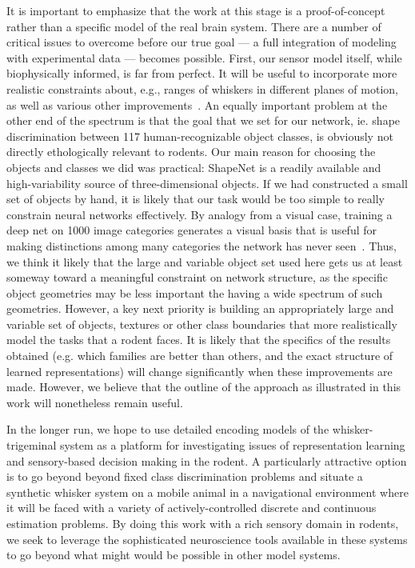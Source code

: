 It is important to emphasize that the work at this stage is a proof-of-concept rather than a specific model of the real brain system.  
There are a number of critical issues to overcome before our true goal --- a full integration of modeling with experimental data --- becomes possible.    
First, our sensor model itself, while biophysically informed, is far from perfect. 
It will be useful to incorporate more realistic constraints about, e.g., ranges of whiskers in different planes of motion, as well as various other improvements~\cite{Quist2014, Huet2016}.
An equally important problem at the other end of the spectrum is that the goal that we set for our network, ie. shape discrimination between 117 human-recognizable object classes, is obviously not directly ethologically relevant to rodents. 
Our main reason for choosing the objects and classes we did was practical: ShapeNet is a readily available and high-variability source of three-dimensional objects. 
If we had constructed a small set of objects by hand, it is likely that our task would be too simple to really constrain neural networks effectively. 
By analogy from a visual case, training a deep net on 1000 image categories generates a visual basis that is useful for making distinctions among many categories the network has never seen~\cite{Yamins2014,cadieu2014deep,razavian2014cnn}.
Thus, we think it likely that the large and variable object set used here gets us at least someway toward a meaningful constraint on network structure, as the specific object geometries may be less important the having a wide spectrum of such geometries. 
However, a key next priority is building an appropriately large and variable set of objects, textures or other class boundaries that more realistically model the tasks that a rodent faces.
It is likely that the specifics of the results obtained (e.g. which families are better than others, and the exact structure of learned representations) will change significantly when these improvements are made.  
However, we believe that the outline of the approach as illustrated in this work will nonetheless remain useful. 

In the longer run, we hope to use detailed encoding models of the whisker-trigeminal system as a platform for investigating issues of representation learning and sensory-based decision making in the rodent. 
A particularly attractive option is to go beyond beyond fixed class discrimination problems and situate a synthetic whisker system on a mobile animal in a navigational environment where it will be faced with a variety of actively-controlled discrete and continuous estimation problems.
By doing this work with a rich sensory domain in rodents, we seek to leverage the sophisticated neuroscience tools available in these systems to go beyond what might would be possible in other model systems.  

